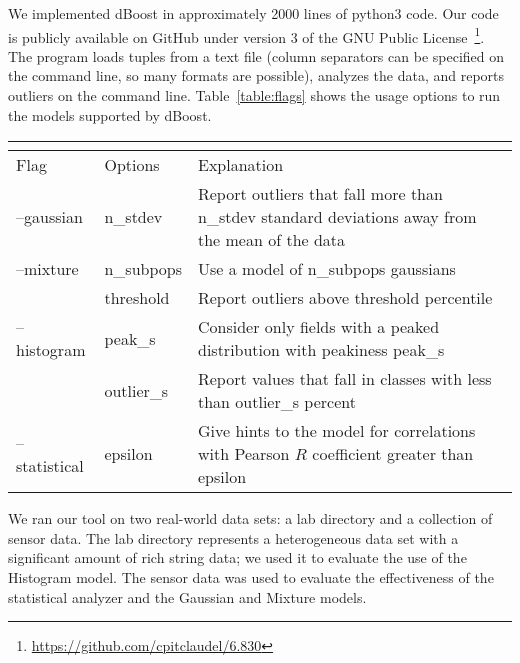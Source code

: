 
We implemented dBoost in approximately 2000 lines of python3 code.
Our code is publicly available on GitHub under version 3 of the GNU Public License~\footnote{\url{https://github.com/cpitclaudel/6.830}}.
The program loads tuples from a text file (column separators can be specified on the command line, so many formats are possible), analyzes the data, and reports outliers on the command line.
Table~\ref{table:flags} shows the usage options to run the models supported by dBoost.

\begin{table*}
  \renewcommand{\arraystretch}{1.2}
  \setlength\tabcolsep{3\tabcolsep}

\label{table:flags}
\caption{dBoost command line usage.}
\centering
\begin{tabular} { l | l | p{10cm} }
\multicolumn{3}{l}{} \\
\hline
Flag & Options & Explanation \\
\hline
--gaussian & n\_stdev & Report outliers that fall more than n\_stdev standard deviations away from the mean of the data \\
--mixture & n\_subpops & Use a model of n\_subpops gaussians \\
  & threshold & Report outliers above threshold percentile \\
--histogram & peak\_s & Consider only fields with a peaked distribution with peakiness peak\_s \\
  & outlier\_s & Report values that fall in classes with less than outlier\_s percent \\
--statistical & epsilon & Give hints to the model for correlations with Pearson $R$ coefficient greater than epsilon \\
\end{tabular}
\end{table*}

We ran our tool on two real-world data sets: a lab directory and a collection of sensor data. The lab directory represents a heterogeneous data set with a significant amount of rich string data; we used it to evaluate the use of the Histogram model. The sensor data was used to evaluate the effectiveness of the statistical analyzer and the Gaussian and Mixture models.

